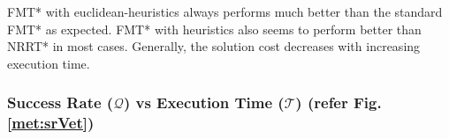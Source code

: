\documentclass{article}
\begin{document}
FMT* with euclidean-heuristics always performs much better than the standard FMT* as expected. FMT* with heuristics also seems to perform better than NRRT* in most cases. Generally, the solution cost decreases with increasing execution time.

\subsubsection{Success Rate ($\mathcal{Q}$) vs Execution Time ($\mathcal{T}$) (refer Fig. \ref{met:srVet})}

\begin{figure}
\end{figure}
\end{document}
